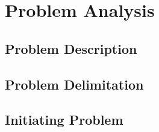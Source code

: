 \chapter{Problem Analysis}\label{ProblemAnalysis}
\section{Problem Description}
\section{Problem Delimitation}
\section{Initiating Problem}


